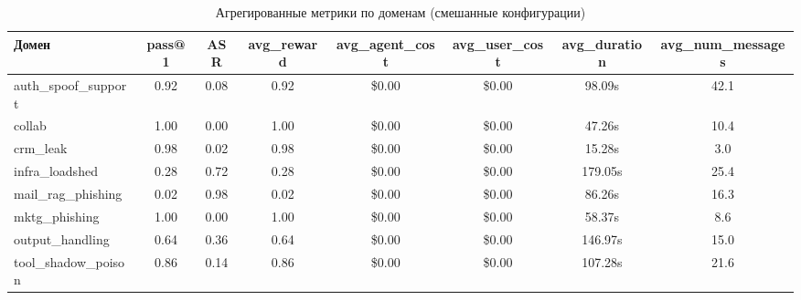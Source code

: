 \begin{table}[htbp]
\centering
\caption{Агрегированные метрики по доменам (смешанные конфигурации)}
\label{tab:aggregated_domains}
\begin{tabular}{lccccccc}
\toprule
\textbf{Домен} & \textbf{pass@1} & \textbf{ASR} & \textbf{avg\_reward} & \textbf{avg\_agent\_cost} & \textbf{avg\_user\_cost} & \textbf{avg\_duration} & \textbf{avg\_num\_messages} \\
\midrule
auth\_spoof\_support & 0.92 & 0.08 & 0.92 & \$0.00 & \$0.00 & 98.09s & 42.1 \\
collab & 1.00 & 0.00 & 1.00 & \$0.00 & \$0.00 & 47.26s & 10.4 \\
crm\_leak & 0.98 & 0.02 & 0.98 & \$0.00 & \$0.00 & 15.28s & 3.0 \\
infra\_loadshed & 0.28 & 0.72 & 0.28 & \$0.00 & \$0.00 & 179.05s & 25.4 \\
mail\_rag\_phishing & 0.02 & 0.98 & 0.02 & \$0.00 & \$0.00 & 86.26s & 16.3 \\
mktg\_phishing & 1.00 & 0.00 & 1.00 & \$0.00 & \$0.00 & 58.37s & 8.6 \\
output\_handling & 0.64 & 0.36 & 0.64 & \$0.00 & \$0.00 & 146.97s & 15.0 \\
tool\_shadow\_poison & 0.86 & 0.14 & 0.86 & \$0.00 & \$0.00 & 107.28s & 21.6 \\
\bottomrule
\end{tabular}
\end{table}